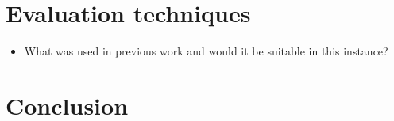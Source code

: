 
\section{Evaluation techniques}
\begin{itemize}
	\item What was used in previous work and would it be suitable in this instance?
\end{itemize}
	
		

\section{Conclusion}

